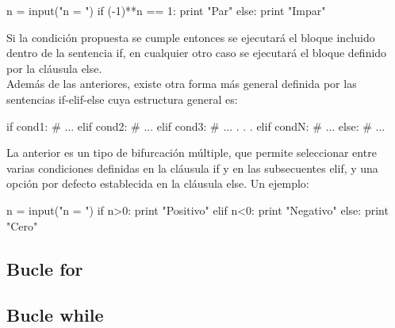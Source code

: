 \begin{python}
	n = input("n = ")
	if (-1)**n == 1:
	    print "Par"
	else:
	    print "Impar"
\end{python}

Si la condición propuesta se cumple entonces se ejecutará el bloque incluido dentro de la 
sentencia if, en cualquier otro caso se ejecutará el bloque definido por la cláusula else.\\

Además de las anteriores, existe otra forma más general definida por las sentencias  
if-elif-else cuya estructura general es:

\begin{python}
	if cond1:
	    # ... 
	elif cond2:
	    # ...
	elif cond3:
	    # ...
	.
	.
	.
	elif condN:
	    # ...
	else:
	    # ...
\end{python}

La anterior es un tipo de bifurcación múltiple, que permite seleccionar entre varias 
condiciones definidas en la cláusula if y en las subsecuentes elif, y una 
opción por defecto establecida en la cláusula else. Un ejemplo: 

\begin{python}
	n = input("n = ")
	if n>0:
	    print "Positivo"
	elif n<0:
	    print "Negativo"
	else:
	    print "Cero"
\end{python}


\subsection{Bucle for}


\subsection{Bucle while}
